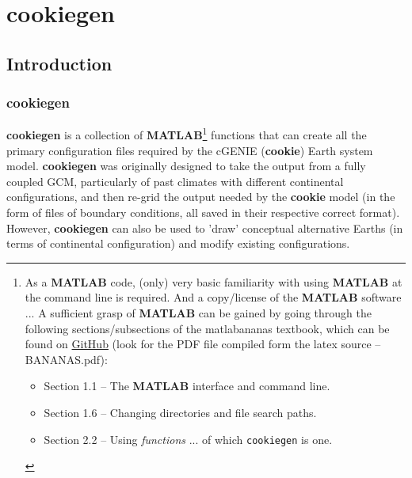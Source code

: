 
\cleardoublepage


\chapter{cookiegen}\label{ch:cookiegen}

\hfill \break
\vspace{24mm}

\newpage

\section{Introduction}


\subsection{cookiegen}

\textbf{cookiegen} is a collection of \textbf{MATLAB}\footnote{As a \textbf{MATLAB} code, (only) very basic familiarity with using \textbf{MATLAB} at the command line is required. And a copy/license of the \textbf{MATLAB} software ... A sufficient grasp of \textbf{MATLAB} can be gained by going through the following sections/subsections of the \textsf{matlabananas} textbook, which can be found on \href{https://github.com/derpycode/matlabananas}{GitHub} (look for the PDF file compiled form the latex source -- \textsf{BANANAS.pdf}):
\vspace{1mm}
\begin{itemize}[noitemsep]
\item Section 1.1 -- The \textbf{MATLAB} interface and command line.
\item Section 1.6 -- Changing directories and file search paths.
\item Section 2.2 -- Using \textit{functions} ... of which \texttt{cookiegen} is one.
\end{itemize}
} functions that can create all the primary configuration files required by the cGENIE (\textbf{cookie}) Earth system model. \textbf{cookiegen} was originally designed to take the output from a fully coupled GCM, particularly of past climates with different continental configurations, and then re-grid the output needed by the \textbf{cookie} model (in the form of files of boundary conditions, all  saved  in their respective correct format). However, \textbf{cookiegen} can also be used to 'draw' conceptual alternative Earths (in terms of continental configuration) and modify existing configurations.

